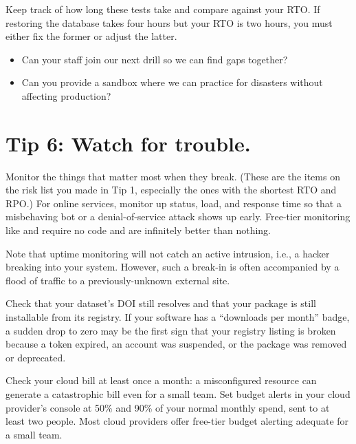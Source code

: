 \documentclass[10pt,letterpaper]{article}
\begin{document}
Keep track of how long these tests take and compare against your RTO. If
restoring the database takes four hours but your RTO is two hours, you must
either fix the former or adjust the latter.

\begin{notebox}
  \begin{itemize}
  \item Can your staff join our next drill so we can find gaps together?
  \item Can you provide a sandbox where we can practice for disasters without
    affecting production?
  \end{itemize}
\end{notebox}

\section*{Tip 6: Watch for trouble.}

Monitor the things that matter most when they break.  (These are the items on
the risk list you made in Tip 1, especially the ones with the shortest RTO and
RPO.) For online services, monitor up status, load, and response time so that a
misbehaving bot or a denial-of-service attack shows up early. Free-tier
monitoring like  and
 require no code and are
infinitely better than nothing.

\begin{notebox}
  Note that uptime monitoring will not catch an active intrusion, i.e., a hacker
  breaking into your system. However, such a break-in is often accompanied by a
  flood of traffic to a previously-unknown external site.
\end{notebox}

Check that your dataset's DOI still resolves and that your package is still
installable from its registry. If your software has a ``downloads per month''
badge, a sudden drop to zero may be the first sign that your registry listing is
broken because a token expired, an account was suspended, or the package was
removed or deprecated.

Check your cloud bill at least once a month: a misconfigured resource can
generate a catastrophic bill even for a small team. Set budget alerts in your
cloud provider's console at 50\% and 90\% of your normal monthly spend, sent to
at least two people. Most cloud providers offer free-tier budget alerting
adequate for a small team.
\end{document}
